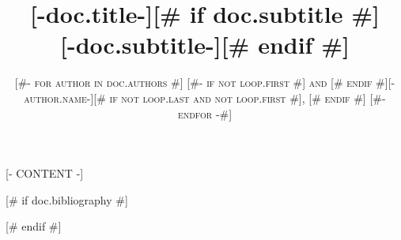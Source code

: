 \documentclass[a4paper,11pt,oneside]{book}
\title{\Huge \textbf{[-doc.title-]}[# if doc.subtitle #] \\ \huge [-doc.subtitle-][# endif #]}
\author{\textsc{
[#- for author in doc.authors #]
  [#- if not loop.first #] and [# endif #][-author.name-][# if not loop.last and not loop.first #], [# endif #]
[#- endfor -#]
}}
\begin{document}
\sloppy

\frontmatter
\maketitle

\tableofcontents

\mainmatter

\renewcommand{\thesection}{\arabic{section}}
\renewcommand{\thesubsection}{\arabic{section}.\arabic{subsection}}

\pagestyle{fancy}
\fancyhf{}
\fancyhead[L]{\slshape\rightmark}
\fancyhead[R]{\thepage}
\renewcommand{\headrulewidth}{0pt}
\renewcommand{\sectionmark}[1]{\markright{#1}}
\renewcommand{\subsectionmark}[1]{\markright{#1}}

[- CONTENT -]

[# if doc.bibliography #]

[# endif #]
\end{document}
